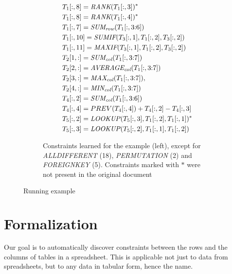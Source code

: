 \begin{figure}[thb]
\begin{subfigure}{.34\textwidth}
{\begin{align*}
      &~\ecrank{\range{T_{1}}{\rangeall}{8}}{\range{T_{1}}{\rangeall}{3}}^*\\
      &~\ecrank{\range{T_{1}}{\rangeall}{8}}{\range{T_{1}}{\rangeall}{4}}^* \\
%
      &~\ecsumr{\range{T_{1}}{\rangeall}{7}}{\range{T_{1}}{\rangeall}{\rangeto{3}{6}}} \\
%
      &~\ecaggif{\textit{SUM}}{\range{T_{1}}{\rangeall}{10}}{\range{T_{3}}{\rangeall}{1}}{\range{T_{1}}{\rangeall}{2}}{\range{T_{3}}{\rangeall}{2}} \\
%
      &~\ecaggif{\textit{MAX}}{\range{T_{1}}{\rangeall}{11}}{\range{T_{3}}{\rangeall}{1}}{\range{T_{1}}{\rangeall}{2}}{\range{T_{3}}{\rangeall}{2}} \\
%
      &~\ecsumc{\range{T_{2}}{1}{\rangeall}}{\range{T_{1}}{\rangeall}{\rangeto{3}{7}}} \\
%
      &~\ecaggc{\textit{AVERAGE}}{\range{T_{2}}{2}{\rangeall}}{\range{T_{1}}{\rangeall}{\rangeto{3}{7}}} \\
%
      &~\ecaggc{\textit{MAX}}{\range{T_{2}}{3}{\rangeall}}{\range{T_{1}}{\rangeall}{\rangeto{3}{7}}},  \\
%
      &~\ecaggc{\textit{MIN}}{\range{T_{2}}{4}{\rangeall}}{\range{T_{1}}{\rangeall}{\rangeto{3}{7}}} \\
%
      &~\ecsumc{\range{T_{4}}{\rangeall}{2}}{\range{T_{1}}{\rangeall}{\rangeto{3}{6}}} \\
%
      &~\range{T_{4}}{\rangeall}{4} = PREV(\range{T_{4}}{\rangeall}{4}) + \range{T_{4}}{\rangeall}{2} - \range{T_{4}}{\rangeall}{3} \\
%
      &~\eclookup{\range{T_{5}}{\rangeall}{2}}{\range{T_{5}}{\rangeall}{3}}{\range{T_{1}}{\rangeall}{2}}{\range{T_{1}}{\rangeall}{1}}^* \\
%
      &~\eclookup{\range{T_{5}}{\rangeall}{3}}{\range{T_{5}}{\rangeall}{2}}{\range{T_{1}}{\rangeall}{1}}{\range{T_{1}}{\rangeall}{2}}
    \end{align*}}
  \vspace{-18pt}
  \caption{Constraints learned for the example (left), except for \textit{ALLDIFFERENT} (18), \textit{PERMUTATION} (2) and \textit{FOREIGNKEY} (5).
  Constraints marked with $*$ were not present in the original document}
  \label{fig:sol_example}
\end{subfigure}
  \caption{Running example}
\end{figure}


\section{Formalization}\label{sec:formalization}
Our goal is to automatically discover constraints between the rows and the columns of tables in a spreadsheet. This is applicable not just to data from spreadsheets, but to any data in tabular form, hence the name.

